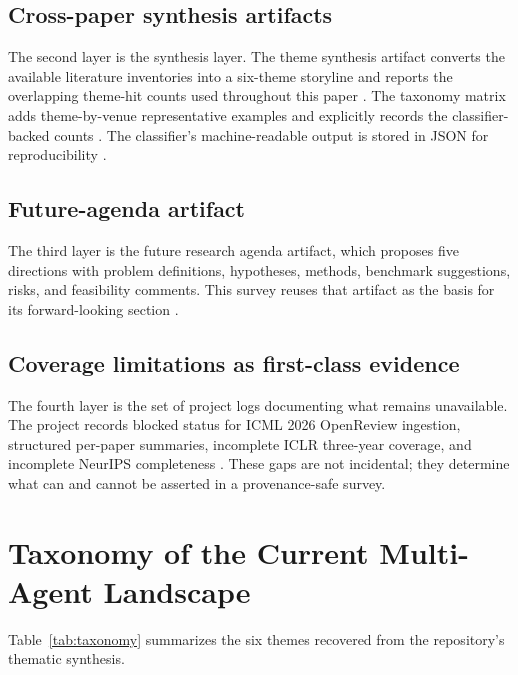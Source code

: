 \documentclass[11pt]{article}
\begin{document}
\subsection{Cross-paper synthesis artifacts}
The second layer is the synthesis layer. The theme synthesis artifact converts the available literature inventories into a six-theme storyline and reports the overlapping theme-hit counts used throughout this paper \cite{theme_synthesis}. The taxonomy matrix adds theme-by-venue representative examples and explicitly records the classifier-backed counts \cite{taxonomy_matrix}. The classifier's machine-readable output is stored in JSON for reproducibility \cite{theme_json}.

\subsection{Future-agenda artifact}
The third layer is the future research agenda artifact, which proposes five directions with problem definitions, hypotheses, methods, benchmark suggestions, risks, and feasibility comments. This survey reuses that artifact as the basis for its forward-looking section \cite{future_directions}.

\subsection{Coverage limitations as first-class evidence}
The fourth layer is the set of project logs documenting what remains unavailable. The project records blocked status for ICML 2026 OpenReview ingestion, structured per-paper summaries, incomplete ICLR three-year coverage, and incomplete NeurIPS completeness \cite{project_readme,project_tasks}. These gaps are not incidental; they determine what can and cannot be asserted in a provenance-safe survey.

\section{Taxonomy of the Current Multi-Agent Landscape}
Table~\ref{tab:taxonomy} summarizes the six themes recovered from the repository's thematic synthesis.
\end{document}
